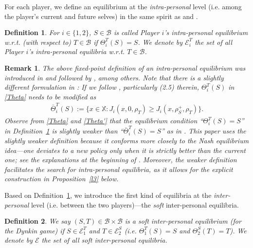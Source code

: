 \documentclass[11pt,reqno]{article}
\numberwithin{equation}{section}
\newtheorem{definition}{Definition}[section]
\newtheorem{remark}{Remark}[section]
\newcommand{\cE}{\mathcal{E}}
\newcommand{\X}{\mathbb{X}}
\newcommand{\B}{\mathcal{B}}
\begin{document}
For {each} player, we define an equilibrium at the {\it intra-personal} level (i.e. among the player's current and future selves) in the same spirit as \cite[Definition 2.2]{HZ20} and \cite[Definition 3.7]{HN18}.

\begin{definition}\label{def:E}
For $i\in\{1,2\}$, $S\in\B$ is called Player $i$'s intra-personal equilibrium w.r.t. (with respect to) $T\in\B$ if $\Theta_i^T(S)=S$. We denote by $\cE_i^T$ the set of all Player $i$'s intra-personal equilibria w.r.t. $T\in\B$. 
\end{definition}

\begin{remark}
The above fixed-point definition of an intra-personal equilibrium was introduced in \cite{HN18} and followed by \cite{HNZ20, HZ20, HY19}, among others. 
Note that there is a slightly different formulation in \cite{HZ19}: If we follow \cite{HZ19}, particularly (2.5) therein, $\Theta^T_i(S)$ in \eqref{Theta} needs to be modified as
\begin{align}\label{Theta'}
\bar \Theta_i^T(S):=\{x\in \X: J_i(x,0,\rho_T)\geq J_i(x,\rho^+_S,\rho_T)\}.%
\end{align}
Observe from \eqref{Theta} and \eqref{Theta'} that the equilibrium condition ``$\Theta_i^T(S)=S$'' in Definition~\ref{def:E} is slightly weaker than ``$\bar \Theta_i^T(S)=S$'' as in \cite[Definition 2.3]{HZ19}. 
This paper uses the slightly weaker definition because it conforms more closely to the Nash equilibrium idea---one deviates to a new policy only when it is strictly better than the current one; see the explanations at the beginning of \cite[p.7]{HN18}. Moreover, the weaker definition facilitates the search for intra-personal equilibria, as it allows for the explicit construction in Proposition~\ref{l3} below.  
\end{remark}

Based on Definition~\ref{def:E}, we introduce the first kind of equilibria at the {\it inter-personal} level (i.e. between the two players)---the {\it soft} inter-personal equilibria.

\begin{definition}\label{def:soft}
We say $(S,T)\in\B\times\B$ is a soft inter-personal equilibrium (for the Dynkin game) if $S\in \cE_1^T$ and $T\in\cE_2^S$ (i.e. $\Theta_1^T(S)=S$ and $\Theta_2^S(T)=T$). 
We denote by $\cE$ the set of all soft inter-personal equilibria.  
\end{definition}
\end{document}
